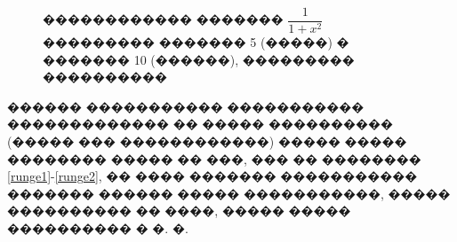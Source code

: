 \documentclass[a4paper]{article}
\begin{document}
\begin{figure}[!h]
  \begin{minipage}[h]{0.49\linewidth}
  \end{minipage}
  \hfill
  \begin{minipage}[h]{0.49\linewidth}
  \end{minipage}
  \caption{������������ ������� $\dfrac{1}{1+x^2}$ ��������� ������� 5 (�����) � ������� 10 (������), ��������� ����������}
  \label{l1}
\end{figure}

������ ����������� ����������� ������������� �� ����� ���������� (����� ��� ������������) ����� ����� �������� ����� �� ���, ��� �� �������� \ref{runge1}-\ref{runge2}, �� ����
������� ����������� ������� ������ ����� �����������, ����� ���������� �� ����, ����� ����� ���������� � �. �.
\end{document}
